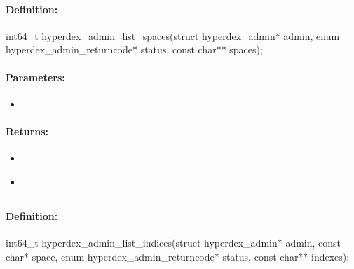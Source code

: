 \paragraph{Definition:}
\begin{ccode}
int64_t hyperdex_admin_list_spaces(struct hyperdex_admin* admin,
        enum hyperdex_admin_returncode* status,
        const char** spaces);
\end{ccode}

\paragraph{Parameters:}
\begin{itemize}[noitemsep]
\item {}\\

\end{itemize}

\paragraph{Returns:}
\begin{itemize}[noitemsep]
\item {}\\

\item {}\\

\end{itemize}

\pagebreak
\subsection{}
\label{api:c:list_indices}


\paragraph{Definition:}
\begin{ccode}
int64_t hyperdex_admin_list_indices(struct hyperdex_admin* admin,
        const char* space,
        enum hyperdex_admin_returncode* status,
        const char** indexes);
\end{ccode}

